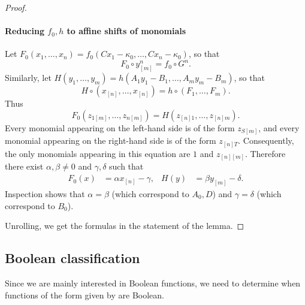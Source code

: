\documentclass{article}
\theoremstyle{definition}
\theoremstyle{remark}
\begin{document}
\begin{proof}
\paragraph{Reducing $f_0,h$ to affine shifts of monomials}
Let $F_0(x_1,\ldots,x_n) = f_0(Cx_1-\kappa_0,\ldots,Cx_n-\kappa_0)$, so that
\[
 F_0 \circ y_{[m]}^n = f_0 \circ G^n.
\]
Similarly, let $H(y_1,\ldots,y_m) = h(A_1y_1-B_1,\ldots,A_my_m-B_m)$, so that
\[
 H \circ (x_{[n]},\ldots,x_{[n]}) = h \circ (F_1,\ldots,F_m).
\]
Thus
\[
 F_0(z_{1[m]},\ldots,z_{n[m]}) = H(z_{[n]1},\ldots,z_{[n]m}).
\]
Every monomial appearing on the left-hand side is of the form $z_{S[m]}$, and every monomial appearing on the right-hand side is of the form $z_{[n]T}$. Consequently, the only monomials appearing in this equation are $1$ and $z_{[n][m]}$. Therefore there exist $\alpha,\beta \neq 0$ and $\gamma,\delta$ such that
\begin{align*}
 F_0(x) &= \alpha x_{[n]} - \gamma, &
 H(y) &= \beta y_{[m]} - \delta.
\end{align*}
Inspection shows that $\alpha = \beta$ (which correspond to $A_0,D$) and $\gamma = \delta$ (which correspond to $B_0$).

Unrolling, we get the formulas in the statement of the lemma.
\end{proof}

\subsection{Boolean classification}
\label{sec:exact-boolean}

Since we are mainly interested in Boolean functions, we need to determine when functions of the form given by  are Boolean.
\end{document}
